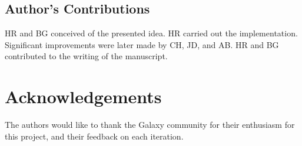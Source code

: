 \documentclass[a4paper,num-refs]{oup-contemporary}
\begin{document}
\subsection{Author's Contributions}
HR and BG conceived of the presented idea. HR carried out the implementation. Significant improvements were later made by CH, JD, and AB. HR and BG contributed to the writing of the manuscript.

\section{Acknowledgements}
The authors would like to thank the Galaxy community for their enthusiasm for this project, and their feedback on each iteration.


\end{document}
